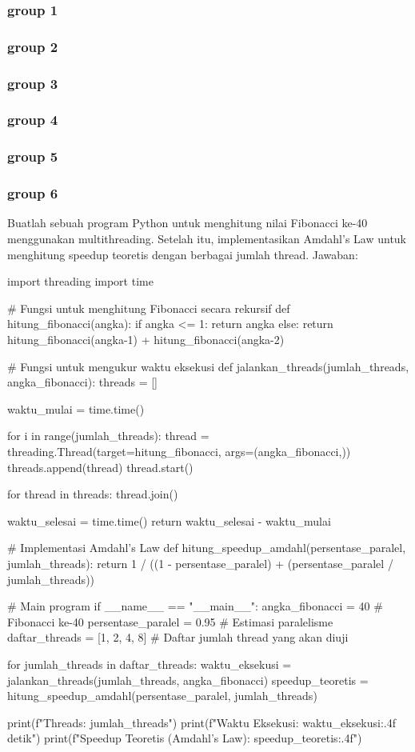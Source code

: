 \documentclass[12pt]{article}
\begin{document}
\subsubsection{group 1}
\subsubsection{group 2}
\subsubsection{group 3}
\subsubsection{group 4}
\subsubsection{group 5}
\subsubsection{group 6}
Buatlah sebuah program Python untuk menghitung nilai Fibonacci ke-40 menggunakan multithreading. Setelah itu, implementasikan Amdahl's Law untuk menghitung speedup teoretis dengan berbagai jumlah thread.
Jawaban:

\begin{python}
import threading
import time

# Fungsi untuk menghitung Fibonacci secara rekursif
def hitung_fibonacci(angka):
    if angka <= 1:
        return angka
    else:
        return hitung_fibonacci(angka-1) + hitung_fibonacci(angka-2)

# Fungsi untuk mengukur waktu eksekusi
def jalankan_threads(jumlah_threads, angka_fibonacci):
    threads = []
    
    waktu_mulai = time.time()
    
    for i in range(jumlah_threads):
        thread = threading.Thread(target=hitung_fibonacci, args=(angka_fibonacci,))
        threads.append(thread)
        thread.start()

    for thread in threads:
        thread.join()
    
    waktu_selesai = time.time()
    return waktu_selesai - waktu_mulai

# Implementasi Amdahl's Law
def hitung_speedup_amdahl(persentase_paralel, jumlah_threads):
    return 1 / ((1 - persentase_paralel) + (persentase_paralel / jumlah_threads))

# Main program
if __name__ == "__main__":
    angka_fibonacci = 40  # Fibonacci ke-40
    persentase_paralel = 0.95  # Estimasi paralelisme
    daftar_threads = [1, 2, 4, 8]  # Daftar jumlah thread yang akan diuji
    
    for jumlah_threads in daftar_threads:
        waktu_eksekusi = jalankan_threads(jumlah_threads, angka_fibonacci)
        speedup_teoretis = hitung_speedup_amdahl(persentase_paralel, jumlah_threads)
        
        print(f"\nJumlah Threads: {jumlah_threads}")
        print(f"Waktu Eksekusi: {waktu_eksekusi:.4f} detik")
        print(f"Speedup Teoretis (Amdahl's Law): {speedup_teoretis:.4f}")
\end{python}
\end{document}

